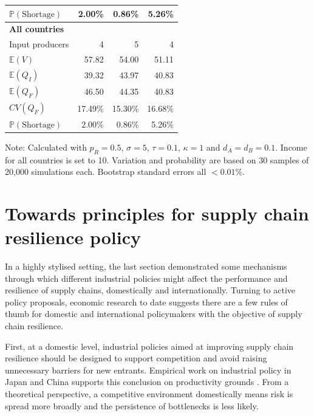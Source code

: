 \documentclass{article}
\begin{document}
\begin{table}
\begin{threeparttable}
\begin{tabular}{lrrr}
            $\mathbb{P}(\text{Shortage})$ & 2.00\% & 0.86\% & 5.26\% \\ 
            \midrule
            \textbf{All countries} \\
            Input producers & 4 & 5 & 4 \\
            $\mathbb{E}(V)$ & 57.82 & 54.00 & 51.11 \\
            $\mathbb{E}(Q_I)$ & 39.32 & 43.97 & 40.83 \\
            $\mathbb{E}(Q_F)$ & 46.50 & 44.35 & 40.83 \\
            $CV(Q_F)$ & 17.49\% & 15.30\% & 16.68\% \\
            $\mathbb{P}(\text{Shortage})$ & 2.00\% & 0.86\% & 5.26\% \\ 
            \bottomrule
        \end{tabular}
        \begin{tablenotes}
            \small \item Note: Calculated with $p_R = 0.5$, $\sigma = 5$, $\tau = 0.1$, $\kappa = 1$ and $d_A = d_B = 0.1$. Income for all countries is set to 10. Variation and probability are based on 30 samples of 20,000 simulations each. Bootstrap standard errors all $<0.01\%$.
        \end{tablenotes}
    \end{threeparttable}
\end{table}

\section{Towards principles for supply chain resilience policy}

In a highly stylised setting, the last section demonstrated some mechanisms through which different industrial policies might affect the performance and resilience of supply chains, domestically and internationally. Turning to active policy proposals, economic research to date suggests there are a few rules of thumb for domestic and international policymakers with the objective of supply chain resilience.

First, at a domestic level, industrial policies aimed at improving supply chain resilience should be designed to support competition and avoid raising unnecessary barriers for new entrants. Empirical work on industrial policy in Japan and China supports this conclusion on productivity grounds \parencite{porter_competition_2004, aghion_industrial_2015}. From a theoretical perspective, a competitive environment domestically means risk is spread more broadly and the persistence of bottlenecks is less likely.
\end{document}
